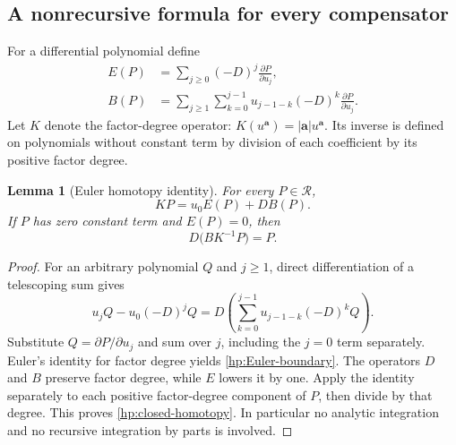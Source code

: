 \documentclass[11pt,a4paper]{article}
\newtheorem{lemma}[theorem]{Lemma}
\theoremstyle{definition}
\theoremstyle{remark}
\numberwithin{equation}{section}
\begin{document}
\subsection{A nonrecursive formula for every compensator}

For a differential polynomial define
\begin{align}
 E(P)&=\sum_{j\ge0}(-D)^j\frac{\partial P}{\partial u_j},
                                      \label{hp:Euler}\\
 B(P)&=\sum_{j\ge1}\sum_{k=0}^{j-1}
           u_{j-1-k}(-D)^k\frac{\partial P}{\partial u_j}.
                                      \label{hp:boundary}
\end{align}
Let $K$ denote the factor-degree operator:
$K(u^{\boldsymbol a})=|\boldsymbol a|u^{\boldsymbol a}$.
Its inverse is defined on polynomials without constant term by
division of each coefficient by its positive factor degree.

\begin{lemma}[Euler homotopy identity]\label{hp:homotopy-lemma}
For every $P\in\mathcal R$,
\begin{equation}\label{hp:Euler-boundary}
                 KP=u_0E(P)+DB(P).
\end{equation}
If $P$ has zero constant term and $E(P)=0$, then
\begin{equation}\label{hp:closed-homotopy}
                   D\bigl(BK^{-1}P\bigr)=P.
\end{equation}
\end{lemma}

\begin{proof}
For an arbitrary polynomial $Q$ and $j\ge1$, direct differentiation
of a telescoping sum gives
\[
 u_jQ-u_0(-D)^jQ
 =D\left(\sum_{k=0}^{j-1}u_{j-1-k}(-D)^kQ\right).
\]
Substitute $Q=\partial P/\partial u_j$ and sum over $j$, including
the $j=0$ term separately. Euler's identity for factor degree yields
\eqref{hp:Euler-boundary}. The operators $D$ and $B$ preserve factor
degree, while $E$ lowers it by one. Apply the identity separately
to each positive factor-degree component of $P$, then divide by that
degree. This proves \eqref{hp:closed-homotopy}. In particular no
analytic integration and no recursive integration by parts is involved.
\end{proof}
\end{document}
